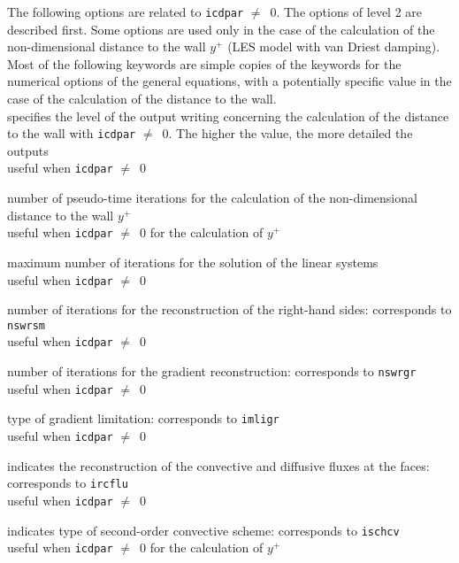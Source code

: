 The following options are related to {\tt icdpar} $\neq$\ 0. The options of
level 2 are described first. Some options are used only in the case of
the calculation of the non-dimensional distance to the wall $y^+$ (LES model with
van Driest damping). Most of the following keywords are simple copies of the
keywords for the numerical options of the general equations, with a potentially
specific value in the case of the calculation of the distance to the wall.\\

{specifies the level of the output writing concerning the calculation of the
distance to the wall with {\tt icdpar} $\neq$\ 0. The higher the value, the more
detailed the outputs\\
useful when {\tt icdpar} $\neq$\ 0}

{number of pseudo-time iterations for the calculation of the non-dimensional
distance to the wall $y^+$\\
useful when {\tt icdpar} $\neq$\ 0 for the calculation of $y^+$}

{maximum number of iterations for the solution of the linear systems\\
useful when {\tt icdpar} $\neq$\ 0}

{number of iterations for the reconstruction of the right-hand sides:
corresponds to {\tt nswrsm}\\
useful when {\tt icdpar} $\neq$\ 0}

{number of iterations for the gradient reconstruction: corresponds to {\tt nswrgr}\\
useful when {\tt icdpar} $\neq$\ 0}

{type of gradient limitation: corresponds to {\tt imligr}\\
useful when {\tt icdpar} $\neq$\ 0}

{indicates the reconstruction of the convective and diffusive fluxes at
the faces: corresponds to {\tt ircflu}\\
useful when {\tt icdpar} $\neq$\ 0}

{indicates type of second-order convective scheme: corresponds to {\tt ischcv}\\
useful when {\tt icdpar} $\neq$\ 0 for the calculation of $y^+$}

